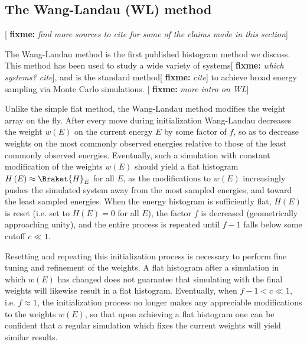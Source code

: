 \documentclass[11pt]{article}
\newcommand{\bk}{\Braket} %
\newcommand{\p}[1]{\left(#1\right)} %
\newcommand{\red}[1]{{\bf \color{red} #1}}
\newcommand{\fixme}[1]{[\red{fixme:} \emph{#1}]}
\begin{document}
\subsection{The Wang-Landau (WL) method}
\label{sec:wang_landau}

\fixme{find more sources to cite for some of the claims made in this
  section}

The Wang-Landau method is the first published histogram method we
discuss\cite{wang_landau, wang_landau_mod, wang_landau_analysis}. This
method has been used to study a wide variety of systems\fixme{which
  systems? cite}, and is the standard method\fixme{cite} to achieve
broad energy sampling via Monte Carlo simulations. \fixme{more intro
  on WL}

Unlike the simple flat method, the Wang-Landau method modifies the
weight array on the fly. After every move during initialization
Wang-Landau decreases the weight $w\p{E}$ on the current energy $E$ by
some factor of $f$, so as to decrease weights on the most commonly
observed energies relative to those of the least commonly observed
energies. Eventually, such a simulation with constant modification of
the weights $w\p{E}$ should yield a flat histogram
$H\p{E}\approx\bk{H}_E$ for all $E$, as the modifications to $w\p{E}$
increasingly pushes the simulated system away from the most sampled
energies, and toward the least sampled energies. When the energy
histogram is sufficiently flat, $H\p{E}$ is reset (i.e. set to
$H\p{E}=0$ for all $E$), the factor $f$ is decreased (geometrically
approaching unity), and the entire process is repeated until $f-1$
falls below some cutoff $c\ll 1$.

Resetting and repeating this initialization process is necessary to
perform fine tuning and refinement of the weights. A flat histogram
after a simulation in which $w\p{E}$ has changed does not guarantee
that simulating with the final weights will likewise result in a flat
histogram. Eventually, when $f-1<c\ll 1$, i.e. $f\approx 1$, the
initialization process no longer makes any appreciable modifications
to the weights $w\p{E}$, so that upon achieving a flat histogram one
can be confident that a regular simulation which fixes the current
weights will yield similar results.
\end{document}

